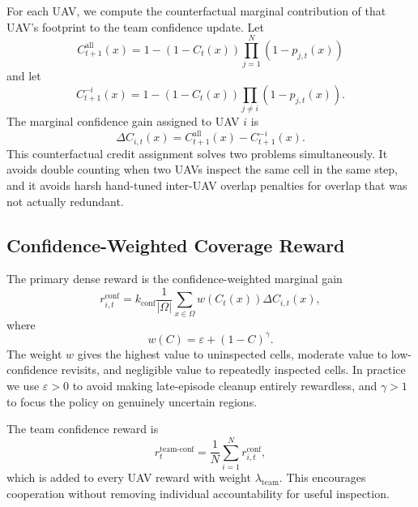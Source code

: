 \documentclass{article}
\newcommand{\conf}{C}
\newcommand{\grid}{\Omega}
\newcommand{\eps}{\varepsilon}
\begin{document}
For each UAV, we compute the counterfactual marginal contribution of that UAV's
footprint to the team confidence update. Let
\begin{equation}
    \conf^{\mathrm{all}}_{t+1}(x)
    =
    1
    -
    (1-\conf_t(x))
    \prod_{j=1}^{N} (1 - p_{j,t}(x))
\end{equation}
and let
\begin{equation}
    \conf^{-i}_{t+1}(x)
    =
    1
    -
    (1-\conf_t(x))
    \prod_{j \ne i} (1 - p_{j,t}(x)).
\end{equation}
The marginal confidence gain assigned to UAV \(i\) is
\begin{equation}
    \Delta \conf_{i,t}(x)
    =
    \conf^{\mathrm{all}}_{t+1}(x)
    -
    \conf^{-i}_{t+1}(x).
    \label{eq:marginal_gain}
\end{equation}
This counterfactual credit assignment solves two problems simultaneously. It
avoids double counting when two UAVs inspect the same cell in the same step, and
it avoids harsh hand-tuned inter-UAV overlap penalties for overlap that was not
actually redundant.

\subsection{Confidence-Weighted Coverage Reward}

The primary dense reward is the confidence-weighted marginal gain
\begin{equation}
    r^{\mathrm{conf}}_{i,t}
    =
    k_{\mathrm{conf}}
    \frac{1}{|\grid|}
    \sum_{x \in \grid}
    w(\conf_t(x)) \Delta \conf_{i,t}(x),
    \label{eq:confidence_reward}
\end{equation}
where
\begin{equation}
    w(\conf) = \eps + (1-\conf)^\gamma.
    \label{eq:confidence_weight}
\end{equation}
The weight \(w\) gives the highest value to uninspected cells, moderate value to
low-confidence revisits, and negligible value to repeatedly inspected cells. In
practice we use \(\eps > 0\) to avoid making late-episode cleanup entirely
rewardless, and \(\gamma > 1\) to focus the policy on genuinely uncertain
regions.

The team confidence reward is
\begin{equation}
    r^{\mathrm{team\text{-}conf}}_t
    =
    \frac{1}{N}
    \sum_{i=1}^{N} r^{\mathrm{conf}}_{i,t},
    \label{eq:team_confidence_reward}
\end{equation}
which is added to every UAV reward with weight \(\lambda_{\mathrm{team}}\). This
encourages cooperation without removing individual accountability for useful
inspection.
\end{document}
